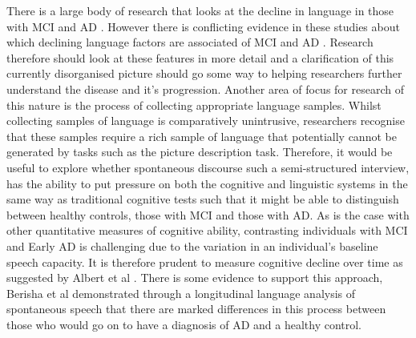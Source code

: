 \documentclass[10pt, letterpaper, twoside, openany]{thesis}
\begin{document}
There is a large body of research that looks at the decline in language in those with MCI and AD \cite{Taler2008, Boschi2017}. However there is conflicting evidence in these studies about which declining language factors are associated of MCI and AD \cite{Taler2008, Boschi2017}. Research therefore should look at these features in more detail and a clarification of this currently disorganised picture should go some way to helping researchers further understand the disease and it's progression. Another area of focus for research of this nature is the process of collecting appropriate language samples. Whilst collecting samples of language is comparatively unintrusive, researchers recognise that these samples require a rich sample of language that potentially cannot be generated by tasks such as the picture description task. Therefore, it would be useful to explore whether spontaneous discourse such a semi-structured interview, has the ability to put pressure on both the cognitive and linguistic systems in the same way as traditional cognitive tests such that it might be able to distinguish between healthy controls, those with MCI and those with AD. As is the case with other quantitative measures of cognitive ability, contrasting individuals with MCI and Early AD is challenging due to the variation in an individual's baseline speech capacity. It is therefore prudent to measure cognitive decline over time as suggested by Albert et al \cite{Albert2011}. There is some evidence to support this approach, Berisha et al \cite{Berisha2015} demonstrated through a longitudinal language analysis of spontaneous speech that there are marked differences in this process between those who would go on to have a diagnosis of AD and a healthy control. 
\par
\end{document}
